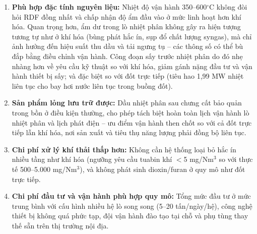 \documentclass[../main.tex]{subfiles}
\begin{document}
\begin{enumerate}
    \item \textbf{Phù hợp đặc tính nguyên liệu:} Nhiệt độ vận hành 350--600$^\circ\mathrm{C}$ không đòi hỏi RDF đồng nhất và chấp nhận độ ẩm đầu vào ở mức linh hoạt hơn khí hóa. Quan trọng hơn, ẩm dư trong lò nhiệt phân không gây ra hiện tượng tương tự như ở khí hóa (bùng phát hắc ín, sụp đổ chất lượng syngas), mà chỉ ảnh hưởng đến hiệu suất thu dầu và tải ngưng tụ -- các thông số có thể bù đắp bằng điều chỉnh vận hành. Công đoạn sấy trước nhiệt phân do đó nhẹ nhàng hơn về yêu cầu kỹ thuật so với khí hóa, giảm gánh nặng đầu tư và vận hành thiết bị sấy; và đặc biệt so với đốt trực tiếp (tiêu hao 1,99 MW nhiệt liên tục cho bay hơi nước liên tục trong buồng đốt).
    \item \textbf{Sản phẩm lỏng lưu trữ được:} Dầu nhiệt phân sau chưng cất bảo quản trong bồn ở điều kiện thường, cho phép tách biệt hoàn toàn lịch vận hành lò nhiệt phân và lịch phát điện -- ưu điểm vận hành then chốt so với cả đốt trực tiếp lẫn khí hóa, nơi sản xuất và tiêu thụ năng lượng phải đồng bộ liên tục.
    \item \textbf{Chi phí xử lý khí thải thấp hơn:} Không cần hệ thống loại bỏ hắc ín nhiều tầng như khí hóa (ngưỡng yêu cầu tuabin khí $<$5 mg/Nm$^3$ so với thực tế 500--5.000 mg/Nm$^3$), và không phát sinh dioxin/furan ở quy mô như đốt trực tiếp.
    \item \textbf{Chi phí đầu tư và vận hành phù hợp quy mô:} Tổng mức đầu tư ở mức trung bình với cấu hình nhiều hệ lò song song (5--20 tấn/ngày/hệ), công nghệ thiết bị không quá phức tạp, đội vận hành đào tạo tại chỗ và phụ tùng thay thế sẵn trên thị trường nội địa.
\end{enumerate}
\end{document}
